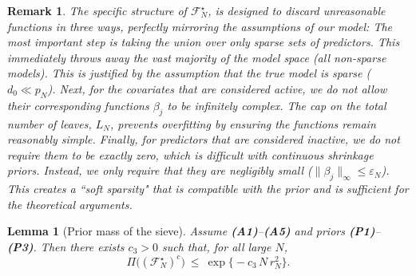 \documentclass[11pt]{article}
\theoremstyle{plain}
\newtheorem{lemma}{Lemma}
\theoremstyle{definition}
\theoremstyle{plain}
\newtheorem{remark}[theorem]{Remark}
\begin{document}
\begin{remark}
The specific structure of $\mathcal{F}_N^\star$, is designed to discard unreasonable functions in three ways, perfectly mirroring the assumptions of our model: The most important step is taking the union over only sparse sets of predictors. This immediately throws away the vast majority of the model space (all non-sparse models). This is justified by the assumption that the true model is sparse ($d_0 \ll p_N$). Next, for the covariates that are considered active, we do not allow their corresponding functions $\beta_j$ to be infinitely complex. The cap on the total number of leaves, $L_N$, prevents overfitting by ensuring the functions remain reasonably simple. Finally, for predictors that are considered inactive, we do not require them to be exactly zero, which is difficult with continuous shrinkage priors. Instead, we only require that they are negligibly small ($\|\beta_j\|_\infty \le \varepsilon_N$). This creates a ``soft sparsity" that is compatible with the prior and is sufficient for the theoretical arguments.
\end{remark}

\begin{lemma}[Prior mass of the sieve]\label{lem:sieve-mass_corrected}
Assume {\textbf{(A1)}}–{\textbf{(A5)}} and priors {\textbf{(P1)}}–{\textbf{(P3)}}. Then there exists $c_3>0$ such that, for all large $N$,
\[
\Pi\bigl((\mathcal F_N^\star)^c\bigr)\ \le\ \exp \bigl\{-c_3\,N\,r_N^2\bigr\}.
\]
\end{lemma}
\end{document}
